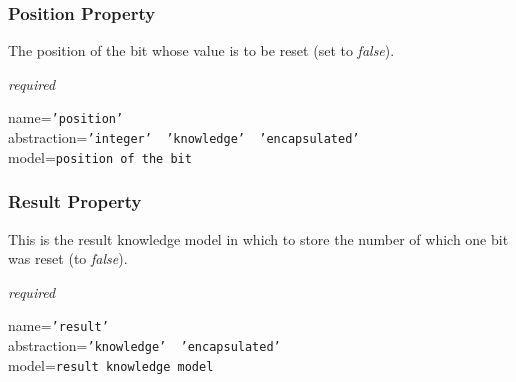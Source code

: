 \subsubsection{Position Property}

The position of the bit whose value is to be reset (set to \emph{false}).

\emph{required}

name=\texttt{'position'}\\
abstraction=\texttt{'integer' \vline\ 'knowledge' \vline\ 'encapsulated'}\\
model=\texttt{position of the bit}

\subsubsection{Result Property}

This is the result knowledge model in which to store the number of which one
bit was reset (to \emph{false}).

\emph{required}

name=\texttt{'result'}\\
abstraction=\texttt{'knowledge' \vline\ 'encapsulated'}\\
model=\texttt{result knowledge model}
